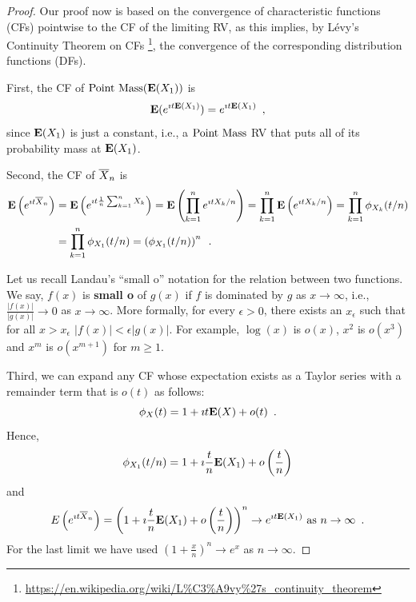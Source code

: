\begin{prop}
{\normalsize
\begin{proof}
Our proof now is based on the convergence of characteristic functions (CFs) pointwise to the CF of the limiting RV, as this implies, by L\'evy's Continuity Theorem on CFs \footnote{\url{https://en.wikipedia.org/wiki/L\%C3\%A9vy\%27s_continuity_theorem}}, the convergence of the corresponding distribution functions (DFs).  

First, the CF of $\mbox{{\rm Point~Mass}}(\mathbf{E}(X_1))$ is 
\[
\mathbf{E}(e^{\imath t \mathbf{E}(X_1)})=e^{\imath t \mathbf{E}(X_1)} \enspace,
\]
since $\mathbf{E}(X_1)$ is just a constant, i.e., a $\mbox{{\rm Point~Mass}}$ RV that puts all of its probability mass at $\mathbf{E}(X_1)$.  

Second, the CF of $\overline{X}_n$ is 
\begin{align*}
\mathbf{E} \left( e^{\imath t \overline{X}_n}\right)
&= \mathbf{E} \left( e^{\imath t \frac{1}{n} \sum_{k=1}^n X_k} \right) = \mathbf{E} \left( \prod_{k=1}^n e^{\imath t X_k/n} \right) = \prod_{k=1}^n \mathbf{E} \left( e^{\imath t X_k/n} \right) = \prod_{k=1}^n \phi_{X_k}(t/n)\\ 
&= \prod_{k=1}^n \phi_{X_1}(t/n) =\left(\phi_{X_1}(t/n)\right)^n \enspace .
\end{align*}

Let us recall Landau's ``small o'' notation for the relation between two functions.  
We say,  $f(x)$ is {\bf small o} of $g(x)$ if $f$ is dominated by $g$ as $x \to \infty$, i.e., $\frac{|f(x)|}{|g(x)|} \to 0$ as $x \to \infty$.  
More formally, for every $\epsilon > 0$, there exists an $x_{\epsilon}$ such that for all $x > x_{\epsilon}$ $|f(x)| < \epsilon |g(x)|$.  
For example, $\log(x)$ is $o(x)$, $x^2$ is $o(x^3)$ and $x^m$ is $o(x^{m+1})$ for $m\geq 1$.  

Third, we can expand any CF whose expectation exists as a Taylor series with a remainder term that is $o(t)$ as follows:
\[
\phi_X(t) = 1 + \imath t \mathbf{E}(X) + o(t) \enspace .
\]
Hence,
\[
\phi_{X_1}(t/n) = 1 + \imath \frac{t}{n} \mathbf{E}(X_1) + o\left(\frac{t}{n}\right) 
\]
and
\[
E \left( e^{\imath t \overline{X}_n}\right) = \left( 1 + \imath \frac{t}{n} \mathbf{E}(X_1) + o\left(\frac{t}{n}\right) \right)^n
\to e^{\imath t \mathbf{E}(X_1)} \text{ as } n \to \infty \enspace .
\]
For the last limit we have used $\left( 1+\frac{x}{n}\right)^n \to e^x$ as $n \to \infty$.


\end{proof}}
\end{prop}
